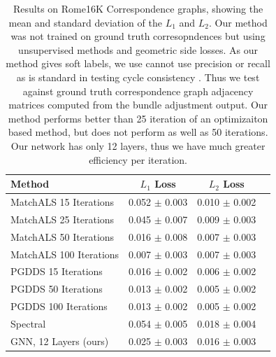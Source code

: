 \documentclass[10pt,twocolumn,letterpaper]{article}
\begin{document}
\begin{table}
\begin{center}
\begin{tabular}{|l|c|c|c|}
\hline
Method                                                    & $L_1$ Loss        & $L_2$ Loss         \\

\hline\hline\hline
MatchALS \cite{zhou2015multi} 15 Iterations               & 0.052 $\pm$ 0.003 & 0.010 $\pm$ 0.002 \\ \hline
MatchALS \cite{zhou2015multi} 25 Iterations               & 0.045 $\pm$ 0.007 & 0.009 $\pm$ 0.003 \\ \hline
MatchALS \cite{zhou2015multi} 50 Iterations               & 0.016 $\pm$ 0.008 & 0.007 $\pm$ 0.003 \\ \hline
MatchALS \cite{zhou2015multi} 100 Iterations              & 0.007 $\pm$ 0.003 & 0.007 $\pm$ 0.003 \\ \hline
PGDDS \cite{leonardos2016distributed} 15 Iterations       & 0.016 $\pm$ 0.002 & 0.006 $\pm$ 0.002 \\ \hline
PGDDS \cite{leonardos2016distributed} 50 Iterations       & 0.013 $\pm$ 0.002 & 0.005 $\pm$ 0.002 \\ \hline
PGDDS \cite{leonardos2016distributed} 100 Iterations      & 0.013 $\pm$ 0.002 & 0.005 $\pm$ 0.002 \\ \hline
Spectral                                                  & 0.054 $\pm$ 0.005 & 0.018 $\pm$ 0.004 \\ \hline \hline
GNN, 12 Layers (ours)                                     & 0.025 $\pm$ 0.003 & 0.016 $\pm$ 0.003 \\
\hline
\end{tabular}
\end{center}

\caption{
Results on Rome16K Correspondence graphs, showing the mean and standard deviation of the $L_1$ and $L_2$.
Our method was not trained on ground truth corresopndences but using unsupervised methods and geometric side losses.
As our method gives soft labels, we use cannot use precision or recall as is standard in testing cycle consistency \cite{zhou2015multi}.
Thus we test against ground truth correspondence graph adjacency matrices computed from the bundle adjustment output.
Our method performs better than 25 iteration of an optimizaiton based method, but does not perform as well as 50 iterations.
Our network has only 12 layers, thus we have much greater efficiency per iteration.
}
\end{table}
\end{document}
